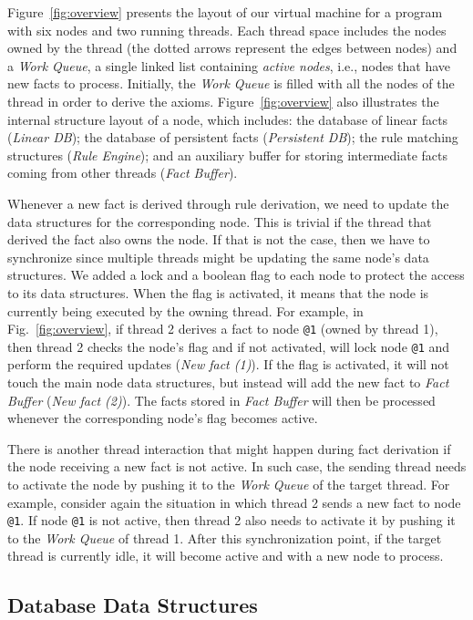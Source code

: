 \documentclass{sigplanconf}
\begin{document}
Figure~\ref{fig:overview} presents the layout of our virtual machine
for a program with six nodes and two running threads. Each thread
space includes the nodes owned by the thread (the dotted arrows
represent the edges between nodes) and a \emph{Work Queue}, a single
linked list containing \emph{active nodes}, i.e., nodes that have new
facts to process. Initially, the \emph{Work Queue} is filled with all
the nodes of the thread in order to derive the
axioms. Figure~\ref{fig:overview} also illustrates the internal
structure layout of a node, which includes: the database of linear
facts (\emph{Linear DB}); the database of persistent facts
(\emph{Persistent DB}); the rule matching structures (\emph{Rule
Engine}); and an auxiliary buffer for storing intermediate facts
coming from other threads (\emph{Fact Buffer}).

Whenever a new fact is derived through rule derivation, we need to
update the data structures for the corresponding node. This is trivial
if the thread that derived the fact also owns the node. If that is not
the case, then we have to synchronize since multiple threads might be
updating the same node's data structures. We added a lock and a
boolean flag to each node to protect the access to its data
structures. When the flag is activated, it means that the node is
currently being executed by the owning thread. For example, in
Fig.~\ref{fig:overview}, if thread 2 derives a fact to
node \texttt{@1} (owned by thread 1), then thread 2 checks the node's
flag and if not activated, will lock node \texttt{@1} and perform the
required updates (\emph{New fact (1)}). If the flag is activated, it
will not touch the main node data structures, but instead will add the
new fact to \emph{Fact Buffer} (\emph{New fact (2)}). The facts stored
in \emph{Fact Buffer} will then be processed whenever the
corresponding node's flag becomes active.

There is another thread interaction that might happen during fact
derivation if the node receiving a new fact is not active. In such
case, the sending thread needs to activate the node by pushing it to
the \emph{Work Queue} of the target thread. For example, consider
again the situation in which thread 2 sends a new fact to
node \texttt{@1}. If node \texttt{@1} is not active, then thread 2
also needs to activate it by pushing it to the \emph{Work Queue} of
thread 1. After this synchronization point, if the target thread is
currently idle, it will become active and with a new node to process.


\subsection{Database Data Structures}
\label{sec:database}
\end{document}
